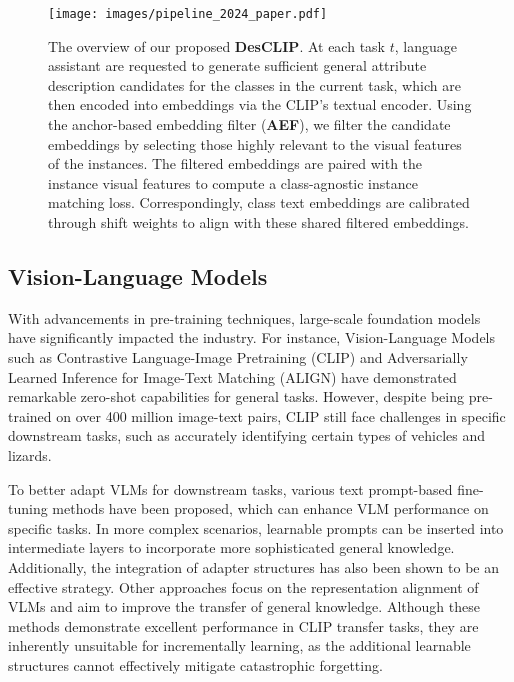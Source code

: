 \begin{figure*}[htbp]
  \centering
  \texttt{[image: images/pipeline\_2024\_paper.pdf]}
   \vspace{-5em}
  \caption{The overview of our proposed \textbf{DesCLIP}. At each task $t$, language assistant are requested to generate sufficient general attribute description candidates for the classes in the current task, which are then encoded into embeddings via the CLIP's textual encoder. Using the anchor-based embedding filter (\textbf{AEF}), we filter the candidate embeddings by selecting those highly relevant to the visual features of the instances. The filtered embeddings are paired with the instance visual features to compute a class-agnostic instance matching loss. Correspondingly, class text embeddings are calibrated through shift weights to align with these shared filtered embeddings.}
  \label{fig:pipeline}
\end{figure*}

\subsection{Vision-Language Models}

With advancements in pre-training techniques, large-scale foundation models \cite{radford2021learning,li2022blip,kirillov2023segment,openai2023gpt4,alayrac2022flamingo} have significantly impacted the industry. For instance, Vision-Language Models such as Contrastive Language-Image Pretraining (CLIP) \cite{radford2021learning} and Adversarially Learned Inference for Image-Text Matching (ALIGN) \cite{jia2021scaling} have demonstrated remarkable zero-shot capabilities for general tasks. However, despite being pre-trained on over 400 million image-text pairs, CLIP still face challenges in specific downstream tasks, such as accurately identifying certain types of vehicles and lizards. 

To better adapt VLMs for downstream tasks, various text prompt-based fine-tuning methods \cite{zhou2022learning, zhou2022conditional, 10171397, yao2023visual, 10814093} have been proposed, which can enhance VLM performance on specific tasks. In more complex scenarios, learnable prompts can be inserted into intermediate layers \cite{yao2024tcp} to incorporate more sophisticated general knowledge. Additionally, the integration of adapter structures \cite{li2024graphadapter,pantazis2022svl,xin2024vmt} has also been shown to be an effective strategy. Other approaches \cite{zhang2024concept, wu2024transferring, luo2024cheap, gao2022pyramidclip} focus on the representation alignment of VLMs and aim to improve the transfer of general knowledge. Although these methods demonstrate excellent performance in CLIP transfer tasks, they are inherently unsuitable for incrementally learning, as the additional learnable structures cannot effectively mitigate catastrophic forgetting.

